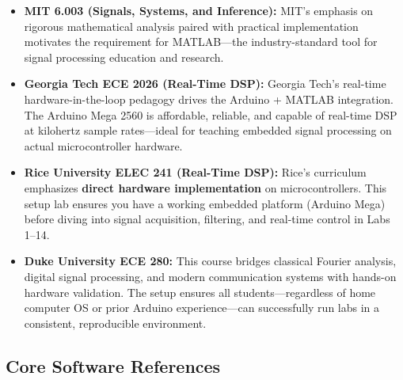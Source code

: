 \documentclass[12pt]{article}
\begin{document}
\begin{itemize}
    \item \textbf{MIT 6.003 (Signals, Systems, and Inference):} MIT's emphasis on rigorous mathematical analysis paired with practical implementation motivates the requirement for MATLAB—the industry-standard tool for signal processing education and research.

    \item \textbf{Georgia Tech ECE 2026 (Real-Time DSP):} Georgia Tech's real-time hardware-in-the-loop pedagogy drives the Arduino + MATLAB integration. The Arduino Mega 2560 is affordable, reliable, and capable of real-time DSP at kilohertz sample rates—ideal for teaching embedded signal processing on actual microcontroller hardware.

    \item \textbf{Rice University ELEC 241 (Real-Time DSP):} Rice's curriculum emphasizes \textbf{direct hardware implementation} on microcontrollers. This setup lab ensures you have a working embedded platform (Arduino Mega) before diving into signal acquisition, filtering, and real-time control in Labs 1--14.

    \item \textbf{Duke University ECE 280:} This course bridges classical Fourier analysis, digital signal processing, and modern communication systems with hands-on hardware validation. The setup ensures all students—regardless of home computer OS or prior Arduino experience—can successfully run labs in a consistent, reproducible environment.
\end{itemize}

\subsection*{Core Software References}
\end{document}
